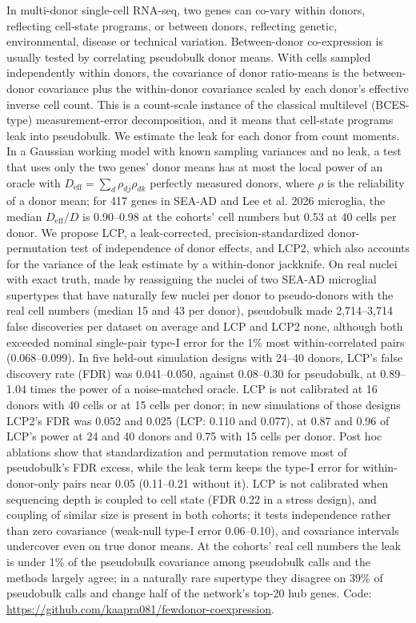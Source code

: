 In multi-donor single-cell RNA-seq, two genes can co-vary within donors, reflecting cell-state programs, or between donors, reflecting genetic, environmental, disease or technical variation. Between-donor co-expression is usually tested by correlating pseudobulk donor means. With cells sampled independently within donors, the covariance of donor ratio-means is the between-donor covariance plus the within-donor covariance scaled by each donor's effective inverse cell count. This is a count-scale instance of the classical multilevel (BCES-type) measurement-error decomposition, and it means that cell-state programs leak into pseudobulk. We estimate the leak for each donor from count moments. In a Gaussian working model with known sampling variances and no leak, a test that uses only the two genes' donor means has at most the local power of an oracle with $D_{\mathrm{eff}}=\sum_d\rho_{dj}\rho_{dk}$ perfectly measured donors, where $\rho$ is the reliability of a donor mean; for 417 genes in SEA-AD and Lee et al. 2026 microglia, the median $D_{\mathrm{eff}}/D$ is 0.90--0.98 at the cohorts' cell numbers but 0.53 at 40 cells per donor. We propose LCP, a leak-corrected, precision-standardized donor-permutation test of independence of donor effects, and LCP2, which also accounts for the variance of the leak estimate by a within-donor jackknife. On real nuclei with exact truth, made by reassigning the nuclei of two SEA-AD microglial supertypes that have naturally few nuclei per donor to pseudo-donors with the real cell numbers (median 15 and 43 per donor), pseudobulk made 2{,}714--3{,}714 false discoveries per dataset on average and LCP and LCP2 none, although both exceeded nominal single-pair type-I error for the 1\% most within-correlated pairs (0.068--0.099). In five held-out simulation designs with 24--40 donors, LCP's false discovery rate (FDR) was 0.041--0.050, against 0.08--0.30 for pseudobulk, at 0.89--1.04 times the power of a noise-matched oracle. LCP is not calibrated at 16 donors with 40 cells or at 15 cells per donor; in new simulations of those designs LCP2's FDR was 0.052 and 0.025 (LCP: 0.110 and 0.077), at 0.87 and 0.96 of LCP's power at 24 and 40 donors and 0.75 with 15 cells per donor. Post hoc ablations show that standardization and permutation remove most of pseudobulk's FDR excess, while the leak term keeps the type-I error for within-donor-only pairs near 0.05 (0.11--0.21 without it). LCP is not calibrated when sequencing depth is coupled to cell state (FDR 0.22 in a stress design), and coupling of similar size is present in both cohorts; it tests independence rather than zero covariance (weak-null type-I error 0.06--0.10), and covariance intervals undercover even on true donor means. At the cohorts' real cell numbers the leak is under 1\% of the pseudobulk covariance among pseudobulk calls and the methods largely agree; in a naturally rare supertype they disagree on 39\% of pseudobulk calls and change half of the network's top-20 hub genes. Code: \url{https://github.com/kaapra081/fewdonor-coexpression}.
